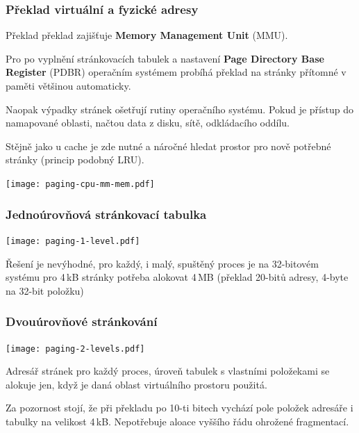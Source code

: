 \documentclass{beamer}
\begin{document}
\begin{frame}
\frametitle{Překlad virtuální a fyzické adresy}

Překlad překlad zajišťuje \textbf{Memory Management Unit} (MMU).

Pro po vyplnění stránkovacích tabulek a nastavení \textbf{Page Directory Base Register}
(PDBR) operačním systémem probíhá překlad na stránky přítomné v paměti většinou automaticky.

Naopak výpadky stránek ošetřují rutiny operačního systému. Pokud je přístup do namapované
oblasti, načtou data z disku, sítě, odkládacího oddílu.

Stějně jako u cache je zde nutné a náročné hledat prostor pro nově potřebné stránky (princip podobný LRU).

\vskip 2mm

{
\centering

\texttt{[image: paging-cpu-mm-mem.pdf]}

}
\end{frame}

\begin{frame}
\frametitle{Jednoúrovňová stránkovací tabulka}

{
\centering

\texttt{[image: paging-1-level.pdf]}

}

Řešení je nevýhodné, pro každý, i malý, spuštěný proces je na 32-bitovém
systému pro 4\,kB stránky potřeba alokovat 4\,MB (překlad 20-bitů adresy,
4-byte na 32-bit položku) 

\end{frame}


\begin{frame}
\frametitle{Dvouúrovňové stránkování}

{
\centering

\texttt{[image: paging-2-levels.pdf]}

}

Adresář stránek pro každý proces, úroveň tabulek s vlastními položekami
se alokuje jen, když je daná oblast virtuálního prostoru použitá.

Za pozornost stojí, že při překladu po 10-ti bitech vychází pole položek
adresáře i tabulky na velikost 4\,kB. Nepotřebuje aloace vyššího řádu
ohrožené fragmentací.

\end{frame}
\end{document}
